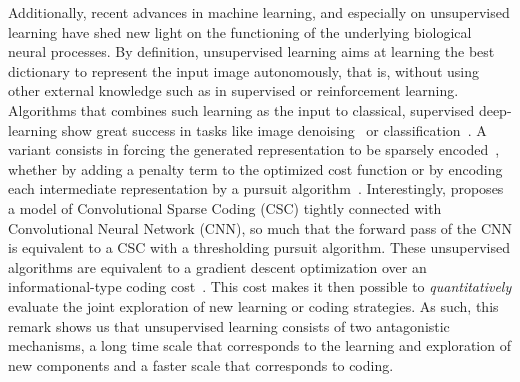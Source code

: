 \documentclass[draft]{article} %
\begin{document}
Additionally, recent advances in machine learning, and especially on unsupervised learning have shed new light on the functioning of the underlying biological neural processes. By definition, unsupervised learning aims at learning the best dictionary to represent the input image autonomously, that is, without using other external knowledge such as in supervised or reinforcement learning. Algorithms that combines such learning as the input to classical, supervised deep-learning show great success in tasks like image denoising~\citep{Vincent08} or classification~\citep{Sulam2017multi}. A variant consists in forcing the generated representation to be sparsely encoded~\citep{MakhzaniF13}, whether by adding a penalty term to the optimized cost function or by encoding each intermediate representation by a pursuit algorithm~\citep{Papyan16}. Interestingly, \citep{Papyan16} proposes a model of Convolutional Sparse Coding (CSC) tightly connected with Convolutional Neural Network (CNN), so much that the forward pass of the CNN is equivalent to a CSC with a thresholding pursuit algorithm. These unsupervised algorithms are equivalent to a gradient descent optimization over an informational-type coding cost~\citep{Kingma13}. This cost makes it then possible to \emph{quantitatively} evaluate the joint exploration of new learning or coding strategies. As such, this remark shows us that unsupervised learning consists of two antagonistic mechanisms, a long time scale that corresponds to the learning and exploration of new components and a faster scale that corresponds to coding.
\end{document}
